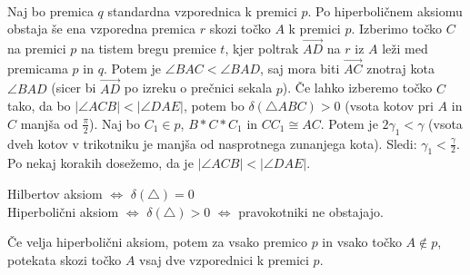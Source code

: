 \begin{dokaz}
            \\ Naj bo premica $q$ standardna vzporednica k premici $p$. Po hiperboličnem aksiomu obstaja še ena vzporedna premica $r$ skozi točko $A$ k premici $p$. Izberimo točko $C$ na premici $p$ na tistem bregu premice $t$, kjer poltrak $\overrightarrow{AD}$ na $r$ iz $A$ leži med premicama $p$ in $q$. Potem je $\angle BAC<\angle BAD$, saj mora biti $\overrightarrow{AC}$ znotraj kota $\angle BAD$ (sicer bi $\overrightarrow{AD}$ po izreku o prečnici sekala $p$). Če lahko izberemo točko $C$ tako, da bo $|\angle ACB|<|\angle DAE|$, potem bo $\delta(\triangle ABC)>0$ (vsota kotov pri $A$ in $C$ manjša od $\frac{\pi}{2}$).
            Naj bo $C_1\in p$, $B\ast C\ast C_1$ in $CC_1\cong AC$. Potem je $2\gamma_1<\gamma$ (vsota dveh kotov v trikotniku je manjša od nasprotnega zunanjega kota). Sledi: $\gamma_1<\frac{\gamma}{2}$. Po nekaj korakih dosežemo, da je $|\angle ACB|<|\angle DAE|$.
        \end{dokaz}

    \begin{posledica}
        Hilbertov aksiom $\Leftrightarrow$ $\delta(\triangle)=0$
        \\ Hiperbolični aksiom $\Leftrightarrow$ $\delta(\triangle)>0$ $\Leftrightarrow$ pravokotniki ne obstajajo.
    \end{posledica}

    \begin{trditev}
        Če velja hiperbolični aksiom, potem za vsako premico $p$ in vsako točko $A\notin p$, potekata skozi točko $A$ vsaj dve vzporednici k premici $p$.
    \end{trditev}

